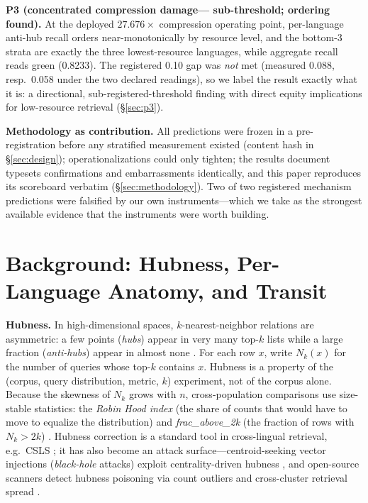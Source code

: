 \documentclass[11pt]{article}
\begin{document}
\textbf{P3 (concentrated compression damage--- sub-threshold; ordering
found).} At the deployed $27.676\times$ compression operating point,
per-language anti-hub recall orders near-monotonically by resource level,
and the bottom-3 strata are exactly the three lowest-resource languages,
while aggregate recall reads green (0.8233). The registered 0.10 gap was
\emph{not} met (measured 0.088, resp.\ 0.058 under the two declared
readings), so we label the result exactly what it is: a directional,
sub-registered-threshold finding with direct equity implications for
low-resource retrieval (\S\ref{sec:p3}).

\textbf{Methodology as contribution.} All predictions were frozen in a
pre-registration before any stratified measurement existed (content hash
in \S\ref{sec:design}); operationalizations could only tighten; the
results document typesets confirmations and embarrassments identically,
and this paper reproduces its scoreboard verbatim
(\S\ref{sec:methodology}). Two of two registered mechanism predictions
were falsified by our own instruments---which we take as the strongest
available evidence that the instruments were worth building.

\section{Background: Hubness, Per-Language Anatomy, and Transit}
\label{sec:background}

\textbf{Hubness.} In high-dimensional spaces, $k$-nearest-neighbor
relations are asymmetric: a few points (\emph{hubs}) appear in very many
top-$k$ lists while a large fraction (\emph{anti-hubs}) appear in almost
none \cite{radovanovic2010hubs}. For each row $x$, write $N_k(x)$ for the
number of queries whose top-$k$ contains $x$. Hubness is a property of the
(corpus, query distribution, metric, $k$) experiment, not of the corpus
alone. Because the skewness of $N_k$ grows with $n$, cross-population
comparisons use size-stable statistics: the \emph{Robin Hood index} (the
share of counts that would have to move to equalize the distribution) and
\emph{frac\_above\_2k} (the fraction of rows with $N_k > 2k$)
\cite{feldbauer2020scikit}. Hubness correction is a standard tool in
cross-lingual retrieval, e.g.\ CSLS \cite{conneau2018word}; it has also
become an attack surface---centroid-seeking vector injections
(\emph{black-hole} attacks) exploit centrality-driven hubness
\cite{blackhole2026}, and open-source scanners detect hubness poisoning
via count outliers and cross-cluster retrieval spread \cite{advhubness2026}.
\end{document}
